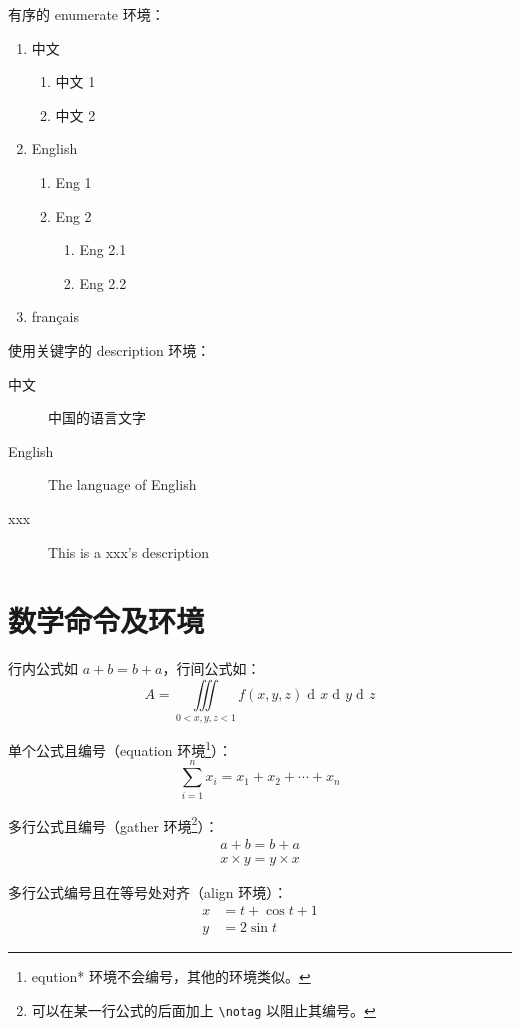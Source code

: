 \documentclass[UTF8,hyperref,space=auto]{ctexart} %
\theoremstyle{plain}
\theoremstyle{plain}
\theoremstyle{plain}
\theoremstyle{plain}
\theoremstyle{nonumberplain}
\DeclareMathOperator{\diff}{d\!} %
\begin{document}
有序的 enumerate 环境：
\begin{enumerate}
	\item 中文
	\begin{enumerate}
		\item 中文 1
		\item 中文 2
	\end{enumerate}
	\item English
	\begin{enumerate}
		\item Eng 1
		\item Eng 2
		\begin{enumerate}
			\item Eng 2.1
			\item Eng 2.2
		\end{enumerate}
	\end{enumerate}
	\item français
\end{enumerate}

使用关键字的 description 环境：
\begin{description}
	\item[中文] 中国的语言文字
	\item[English] The language of English
	\item[xxx] This is a xxx's description
\end{description}


\section{数学命令及环境}
行内公式如 $a+b=b+a$，行间公式如：
\[ A = \iiint\limits_{0<x,y,z<1} f(x,y,z) \diff x \diff y \diff z \]

单个公式且编号（equation 环境\footnote{eqution* 环境不会编号，其他的环境类似。}）：
\begin{equation}
	\sum_{i=1}^{n} x_i = x_1 + x_2 + \cdots + x_n
\end{equation}

多行公式且编号（gather 环境\cprotect\footnote{可以在某一行公式的后面加上 \verb|\notag| 以阻止其编号。}）：
\begin{gather}
	a+b = b+a \\
	x\times y = y\times x
\end{gather}

多行公式编号且在等号处对齐（align 环境）：
\begin{align}
	x &= t + \cos t + 1 \\
	y &= 2\sin t
\end{align}
\end{document}
